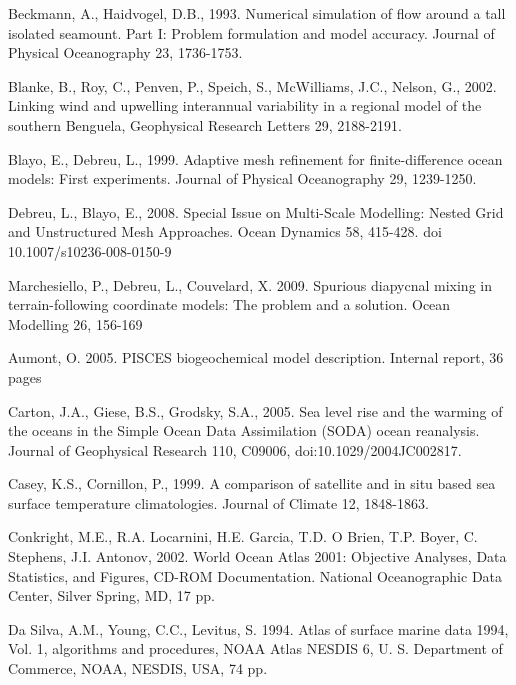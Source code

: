 Beckmann, A., Haidvogel, D.B.,
1993.
Numerical simulation of flow around a tall
isolated seamount. Part I: Problem formulation
and model accuracy.
Journal of Physical Oceanography
23,
1736-1753.

Blanke, B., Roy, C., Penven, P., Speich, S., 
McWilliams, J.C., Nelson, G.,
2002.
Linking wind and upwelling interannual variability in a
regional model of the southern Benguela,
Geophysical Research Letters
29,
2188-2191.

Blayo, E., Debreu, L.,
1999.
Adaptive mesh refinement for finite-difference
ocean models: First experiments.
Journal of Physical Oceanography
29, 1239-1250.

Debreu, L., Blayo, E.,
2008.
Special Issue on Multi-Scale Modelling:
Nested Grid and Unstructured Mesh Approaches.
Ocean Dynamics
58, 415-428.
doi 10.1007/s10236-008-0150-9

Marchesiello, P., Debreu, L., Couvelard, X.
2009.
Spurious diapycnal mixing in terrain-following coordinate models: The problem
and a solution.
Ocean Modelling
26,
156-169

Aumont, O.
2005.
PISCES biogeochemical model description.
Internal report, 36 pages

Carton, J.A., Giese, B.S., Grodsky, S.A., 2005. 
Sea level rise and the warming of the oceans in the 
{Simple Ocean Data Assimilation (SODA)} ocean reanalysis.
Journal of Geophysical Research
110, {C}09006, doi:10.1029/2004{JC}002817.

Casey, K.S., Cornillon, P., 1999. 
A comparison of satellite and in situ based
sea surface temperature climatologies. 
Journal of Climate 
12, 1848-1863.

Conkright, M.E., R.A. Locarnini, H.E. Garcia, T.D. O Brien, 
T.P. Boyer, C. Stephens, J.I. Antonov, 2002. 
World Ocean Atlas 2001: Objective Analyses, Data Statistics, 
and Figures, CD-ROM Documentation. 
National Oceanographic Data Center, 
Silver Spring, MD, 
17 pp.

Da Silva, A.M., Young, C.C., Levitus, S.
1994.
Atlas of surface marine data 1994,
Vol. 1,
algorithms and procedures,
NOAA Atlas NESDIS 6,
U. S. Department of Commerce,
NOAA,
NESDIS,
USA,
74 pp.

